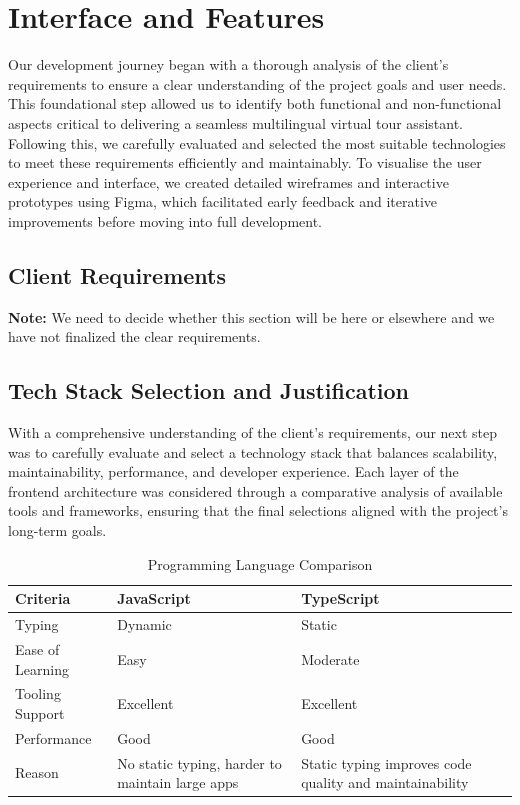 \section{ Interface and Features}

Our development journey began with a thorough analysis of the client’s requirements to ensure a clear understanding of the project goals and user needs. This foundational step allowed us to identify both functional and non-functional aspects critical to delivering a seamless multilingual virtual tour assistant. Following this, we carefully evaluated and selected the most suitable technologies to meet these requirements efficiently and maintainably. To visualise the user experience and interface, we created detailed wireframes and interactive prototypes using Figma, which facilitated early feedback and iterative improvements before moving into full development.

\subsection{Client Requirements}

\textbf{Note:} We need to decide whether this section will be here or elsewhere and we have not finalized the clear requirements.

\subsection{Tech Stack Selection and Justification}

With a comprehensive understanding of the client's requirements, our next step was to carefully evaluate and select a technology stack that balances scalability, maintainability, performance, and developer experience. Each layer of the frontend architecture was considered through a comparative analysis of available tools and frameworks, ensuring that the final selections aligned with the project’s long-term goals.

\begin{table}[H]
\centering
\caption{Programming Language Comparison}
\begin{tabular}{|l|p{6cm}|p{6cm}|}
\hline
\textbf{Criteria}       & \textbf{JavaScript} & \textbf{TypeScript} \\
\hline
Typing                  & Dynamic             & Static             \\
Ease of Learning        & Easy                & Moderate           \\
Tooling Support        & Excellent           & Excellent          \\
Performance            & Good                & Good               \\
Reason                 & No static typing, harder to maintain large apps & Static typing improves code quality and maintainability \\
\hline
\end{tabular}
\label{tab:programming-language-comparison}
\end{table}

